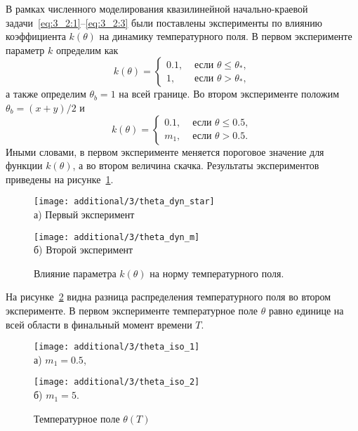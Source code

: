 В рамках численного моделирования квазилинейной начально-краевой задачи~\eqref{eq:3_2:1}--\eqref{eq:3_2:3}
были поставлены эксперименты по влиянию коэффициента $k(\theta)$ на динамику температурного поля.
В первом эксперименте параметр $k$ определим как
\[
    k(\theta)=
    \begin{cases}
        0.1, & \text { если } \theta \leq \theta_{*}, \\
        1, & \text { если } \theta>\theta_{*},
    \end{cases}
\]
а также определим $\theta_b = 1$ на всей границе.
Во втором эксперименте положим $\theta_b = (x + y) /2$ и
\[
    k(\theta)=
    \begin{cases}
        0.1, & \text { если } \theta \leq 0.5, \\
        m_1, & \text { если } \theta > 0.5.
    \end{cases}
\]
Иными словами, в первом эксперименте меняется пороговое значение
для функции $k(\theta)$, а во втором величина скачка.
Результаты экспериментов приведены на рисунке~\ref{fig:4_3:theta_dyn_diff}.
\begin{figure}[h!t]
    \begin{minipage}[b][][b]{0.49\linewidth}
        \centering
        \texttt{[image: additional/3/theta\_dyn\_star]} \\ а) Первый эксперимент
    \end{minipage}
    \hfill
    \begin{minipage}[b][][b]{0.49\linewidth}
        \centering
        \texttt{[image: additional/3/theta\_dyn\_m]} \\ б) Второй эксперимент
    \end{minipage}
    \caption{Влияние параметра $k(\theta)$ на норму температурного поля.}
    \label{fig:4_3:theta_dyn_diff}
\end{figure}
На рисунке~\ref{fig:4_3:theta_iso_2exp} видна разница распределения температурного поля
во втором эксперименте.
В первом эксперименте температурное поле $\theta$ равно единице на всей области в
финальный момент времени $T$.
\begin{figure}[h!t]
    \begin{minipage}[b][][b]{0.49\linewidth}
        \centering
        \texttt{[image: additional/3/theta\_iso\_1]} \\ а) $m_1 = 0.5$,
    \end{minipage}
    \hfill
    \begin{minipage}[b][][b]{0.49\linewidth}
        \centering
        \texttt{[image: additional/3/theta\_iso\_2]} \\ б) $m_1 = 5$.
    \end{minipage}
    \caption{Температурное поле $\theta (T)$}
    \label{fig:4_3:theta_iso_2exp}
\end{figure}

